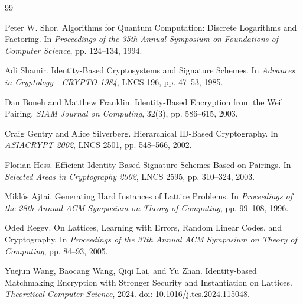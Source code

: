 \documentclass[UTF8,a4paper,12pt,oneside,openany,fontset=fandol]{ctexrep}
\newcommand{\reportheader}{全国密码技术竞赛作品设计报告}
\renewcommand{\headrulewidth}{0pt}
\renewcommand{\footrulewidth}{0pt}
\renewcommand{\headrulewidth}{0.4pt}
\renewcommand{\footrulewidth}{0pt}
\begin{document}
\clearpage
\hypersetup{pageanchor=true}
\pagestyle{frontmatter}
\begingroup
\linespread{1.15}\selectfont
\tableofcontents
\clearpage
\endgroup
{}
\fancypagestyle{plain}{
  \fancyhf{}
  \fancyhead[C]{\small\songti\reportheader}
  \fancyfoot[C]{\small\thepage}
  \renewcommand{\headrulewidth}{0.4pt}
  \renewcommand{\footrulewidth}{0pt}
}
\pagestyle{mainmatter}










\appendix


\clearpage
{}
\begin{thebibliography}{99}
\small

Peter W. Shor.
Algorithms for Quantum Computation: Discrete Logarithms and Factoring.
In \emph{Proceedings of the 35th Annual Symposium on Foundations of Computer Science},
pp. 124--134, 1994.

Adi Shamir.
Identity-Based Cryptosystems and Signature Schemes.
In \emph{Advances in Cryptology---CRYPTO 1984}, LNCS 196, pp. 47--53, 1985.

Dan Boneh and Matthew Franklin.
Identity-Based Encryption from the Weil Pairing.
\emph{SIAM Journal on Computing}, 32(3), pp. 586--615, 2003.

Craig Gentry and Alice Silverberg.
Hierarchical ID-Based Cryptography.
In \emph{ASIACRYPT 2002}, LNCS 2501, pp. 548--566, 2002.

Florian Hess.
Efficient Identity Based Signature Schemes Based on Pairings.
In \emph{Selected Areas in Cryptography 2002}, LNCS 2595, pp. 310--324, 2003.

Miklós Ajtai.
Generating Hard Instances of Lattice Problems.
In \emph{Proceedings of the 28th Annual ACM Symposium on Theory of Computing},
pp. 99--108, 1996.

Oded Regev.
On Lattices, Learning with Errors, Random Linear Codes, and Cryptography.
In \emph{Proceedings of the 37th Annual ACM Symposium on Theory of Computing},
pp. 84--93, 2005.

Yuejun Wang, Baocang Wang, Qiqi Lai, and Yu Zhan.
Identity-based Matchmaking Encryption with Stronger Security and Instantiation on Lattices.
\emph{Theoretical Computer Science}, 2024.
doi: 10.1016/j.tcs.2024.115048.


\end{thebibliography}
\end{document}
